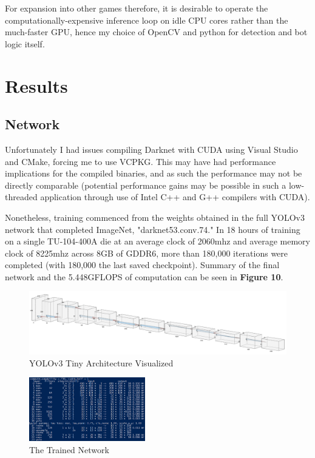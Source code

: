 \documentclass[sigconf]{acmart}
\begin{document}
For expansion into other games therefore, it is desirable to operate the computationally-expensive inference loop on idle CPU cores rather than the much-faster GPU, hence my choice of OpenCV and python for detection and bot logic itself.


\section{Results}
\subsection{Network}

Unfortunately I had issues compiling Darknet with CUDA using Visual Studio and CMake, forcing me to use VCPKG. This may have had performance implications for the compiled binaries, and as such the performance may not be directly comparable (potential performance gains may be possible in such a low-threaded application through use of Intel C++ and G++ compilers with CUDA).\cite{Compile}

Nonetheless, training commenced from the weights obtained in the full YOLOv3 network that completed ImageNet, "darknet53.conv.74." In 18 hours of training on a single TU-104-400A die at an average clock of 2060mhz and average memory clock of 8225mhz across 8GB of GDDR6, more than 180,000 iterations were completed (with 180,000 the last saved checkpoint). Summary of the final network and the 5.448GFLOPS of computation can be seen in \textbf{Figure 10}.

\begin{figure}[h]
  \includegraphics[width=\textwidth]{tinyflat.PNG}
  \caption{YOLOv3 Tiny Architecture Visualized}
  \label{fig:tinyflat}
\end{figure}

\begin{figure}[h]
  \includegraphics[width=0.45\textwidth]{compute.PNG}
  \caption{The Trained Network}
  \label{fig:compute}
\end{figure}
\end{document}
